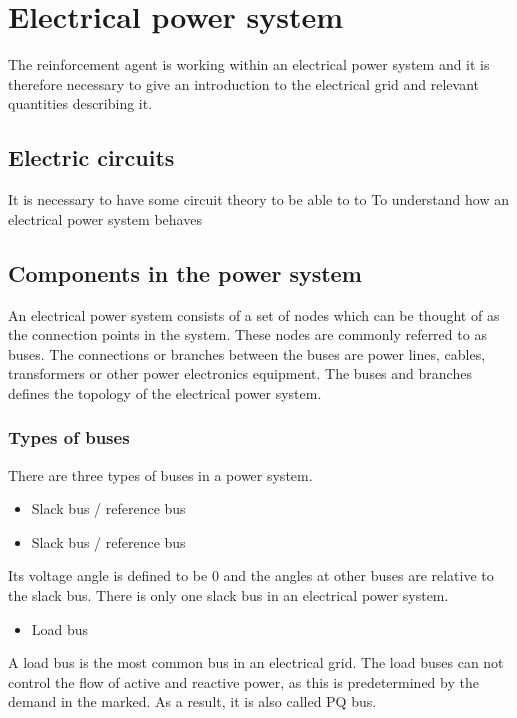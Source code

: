 \documentclass{report}
\begin{document}
\chapter{Electrical power system}
The reinforcement agent is working within an electrical power system and it is therefore necessary to give an introduction to the electrical grid and relevant quantities describing it. 

\section{Electric circuits}
It is necessary to have some circuit theory to be able to  to To understand how an electrical power system behaves 

\section{Components in the power system}
An electrical power system consists of a set of nodes which can be thought of as the connection points in the system. These nodes are commonly referred to as buses. The connections or branches between the buses are power lines, cables, transformers or other power electronics equipment. The buses and branches defines the topology of the electrical power system.

\subsection{Types of buses}
There are three types of buses in a power system\cite{opf_intro}.

\begin{itemize}
  \item Slack bus / reference bus
\end{itemize}



\begin{itemize}
  \item Slack bus / reference bus
\end{itemize}
Its voltage angle is defined to be 0 and the angles at other buses are relative to the slack bus. There is only one slack bus in an electrical power system.

\begin{itemize}
  \item Load bus
\end{itemize}
A load bus is the most common bus in an electrical grid. The load buses can not control the flow of active and reactive power, as this is predetermined by the demand in the marked. As a result, it is also called PQ bus.
\end{document}
